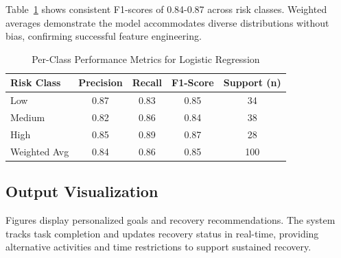 \documentclass[a4paper]{article}
\begin{document}
\begin{table}[htbp]
\caption{Model Performance Comparison}
\label{tab:model_performance}
\centering
{}
\end{table}


Table~\ref{tab:per_class_metrics} shows consistent F1-scores of 0.84-0.87 across risk classes. Weighted averages demonstrate the model accommodates diverse distributions without bias, confirming successful feature engineering.

\begin{table}[htbp]
\caption{Per-Class Performance Metrics for Logistic Regression}
\label{tab:per_class_metrics}
\centering
\begin{tabular}{lcccc}
\hline
\textbf{Risk Class} & \textbf{Precision} & \textbf{Recall} & \textbf{F1-Score} & \textbf{Support (n)} \\
\hline
Low & 0.87 & 0.83 & 0.85 & 34 \\
Medium & 0.82 & 0.86 & 0.84 & 38 \\
High & 0.85 & 0.89 & 0.87 & 28 \\
Weighted Avg & 0.84 & 0.86 & 0.85 & 100 \\
\hline
\end{tabular}
\end{table}

\subsection{Output Visualization}
Figures display personalized goals and recovery recommendations. The system tracks task completion and updates recovery status in real-time, providing alternative activities and time restrictions to support sustained recovery.
\end{document}
